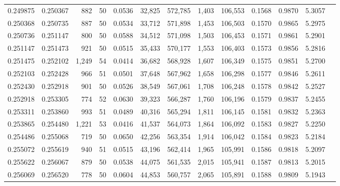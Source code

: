 \begin{tabular}{rrrrrrrrrrrrr}
0.249875 & 0.250367 &   882 &  50 &                                     0.0536 &  32,825 & 572,785 &   1,403 & 106,553 & 0.1568 & 0.9870 & 5.3057 \\
0.250368 & 0.250735 &   887 &  50 &                                     0.0534 &  33,712 & 571,898 &   1,453 & 106,503 & 0.1570 & 0.9865 & 5.2975 \\
0.250736 & 0.251147 &   800 &  50 &                                     0.0588 &  34,512 & 571,098 &   1,503 & 106,453 & 0.1571 & 0.9861 & 5.2901 \\
0.251147 & 0.251473 &   921 &  50 &                                     0.0515 &  35,433 & 570,177 &   1,553 & 106,403 & 0.1573 & 0.9856 & 5.2816 \\
0.251475 & 0.252102 & 1,249 &  54 &                                     0.0414 &  36,682 & 568,928 &   1,607 & 106,349 & 0.1575 & 0.9851 & 5.2700 \\
0.252103 & 0.252428 &   966 &  51 &                                     0.0501 &  37,648 & 567,962 &   1,658 & 106,298 & 0.1577 & 0.9846 & 5.2611 \\
0.252430 & 0.252918 &   901 &  50 &                                     0.0526 &  38,549 & 567,061 &   1,708 & 106,248 & 0.1578 & 0.9842 & 5.2527 \\
0.252918 & 0.253305 &   774 &  52 &                                     0.0630 &  39,323 & 566,287 &   1,760 & 106,196 & 0.1579 & 0.9837 & 5.2455 \\
0.253311 & 0.253860 &   993 &  51 &                                     0.0489 &  40,316 & 565,294 &   1,811 & 106,145 & 0.1581 & 0.9832 & 5.2363 \\
0.253865 & 0.254480 & 1,221 &  53 &                                     0.0416 &  41,537 & 564,073 &   1,864 & 106,092 & 0.1583 & 0.9827 & 5.2250 \\
0.254486 & 0.255068 &   719 &  50 &                                     0.0650 &  42,256 & 563,354 &   1,914 & 106,042 & 0.1584 & 0.9823 & 5.2184 \\
0.255072 & 0.255619 &   940 &  51 &                                     0.0515 &  43,196 & 562,414 &   1,965 & 105,991 & 0.1586 & 0.9818 & 5.2097 \\
0.255622 & 0.256067 &   879 &  50 &                                     0.0538 &  44,075 & 561,535 &   2,015 & 105,941 & 0.1587 & 0.9813 & 5.2015 \\
0.256069 & 0.256520 &   778 &  50 &                                     0.0604 &  44,853 & 560,757 &   2,065 & 105,891 & 0.1588 & 0.9809 & 5.1943 \\

\end{tabular}
